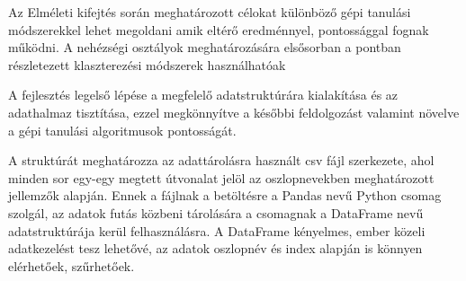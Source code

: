 \label{Chap:dokumen}

Az Elméleti kifejtés során meghatározott célokat különböző gépi tanulási módszerekkel lehet megoldani amik eltérő eredménnyel, pontossággal fognak működni. A nehézségi osztályok meghatározására elsősorban a   pontban részletezett klaszterezési módszerek használhatóak

A fejlesztés legelső lépése a megfelelő adatstruktúrára kialakítása és az adathalmaz tisztítása, ezzel megkönnyítve a későbbi feldolgozást valamint növelve a gépi tanulási algoritmusok pontosságát.

A struktúrát meghatározza az adattárolásra használt csv fájl szerkezete, ahol minden sor egy-egy megtett útvonalat jelöl az oszlopnevekben meghatározott jellemzők alapján. Ennek a fájlnak a betöltésre a Pandas \cite{python-pandas} nevű Python csomag szolgál, az adatok futás közbeni tárolására a csomagnak a DataFrame nevű adatstruktúrája kerül felhasználásra. A DataFrame kényelmes, ember közeli adatkezelést tesz lehetővé, az adatok oszlopnév és index alapján is könnyen elérhetőek, szűrhetőek.





